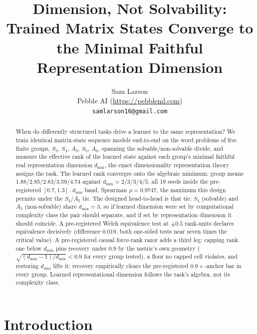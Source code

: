 \documentclass{article}
\title{Dimension, Not Solvability: Trained Matrix States Converge to the
Minimal Faithful Representation Dimension}
\author{%
  Sam Larson\\
  Pebble AI (\url{https://pebbleml.com})\\
  \texttt{samlarson16@gmail.com}%
}
\newcommand{\dmin}{d_{\min}}
\begin{document}
\maketitle

\begin{abstract}
When do differently structured tasks drive a learner to the same
representation? We train identical matrix-state sequence models
end-to-end on the word problems of five finite groups, $S_3$, $S_4$,
$A_5$, $S_5$, $A_6$, spanning the solvable/non-solvable divide, and
measure the effective rank of the learned state against each group's
minimal faithful real representation dimension $\dmin$, the exact
dimensionality representation theory assigns the task. The learned rank
converges onto the algebraic minimum: group means
1.88/2.85/2.83/3.59/4.74 against $\dmin = 2/3/3/4/5$, all 19 seeds
inside the pre-registered $[0.7, 1.3] \cdot \dmin$ band, Spearman
$\rho = 0.9747$, the maximum this design permits under the $S_4$/$A_5$
tie.
The designed head-to-head is that tie: $S_4$ (solvable) and $A_5$
(non-solvable) share $\dmin = 3$, so if learned dimension were set by
computational complexity class the pair should separate, and if set by
representation dimension it should coincide. A pre-registered Welch
equivalence test at $\pm 0.5$ rank-units declares equivalence decisively
(difference 0.019, both one-sided tests near seven times the critical
value).
A pre-registered causal force-rank razor adds a third leg:
capping rank one below $\dmin$ pins recovery under 0.9 by the metric's
own geometry ($\sqrt{(\dmin{-}1)/\dmin} < 0.9$ for every group tested),
a floor no capped cell violates, and restoring $\dmin$ lifts it:
recovery empirically clears the pre-registered $0.9\times$-anchor bar
in every group.
Learned
representational dimension follows the task's algebra, not its
complexity class.
\end{abstract}

\section{Introduction}
\label{sec:intro}
\end{document}
